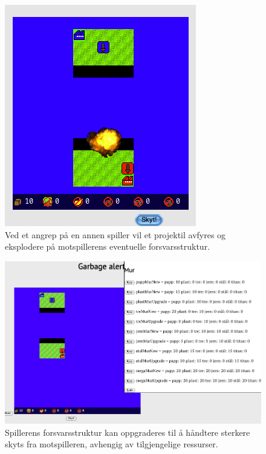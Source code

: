 \begin{figure} [H]
\centering
\includegraphics[scale=0.5]{images/Eksplosjon.png}
\caption{Ved et angrep på en annen spiller vil et projektil avfyres og eksplodere på motspillerens eventuelle forsvarsstruktur.}
\label{fig:Eksplosjon}
\end{figure}

\begin{figure} [H]
\centering
\includegraphics[scale=0.5]{images/OppgradereMur.png}
\caption{Spillerens forsvarsstruktur kan oppgraderes til å håndtere sterkere skyts fra motspilleren, avhengig av tilgjengelige ressurser.}
\label{fig:OppgradereMur}
\end{figure}

